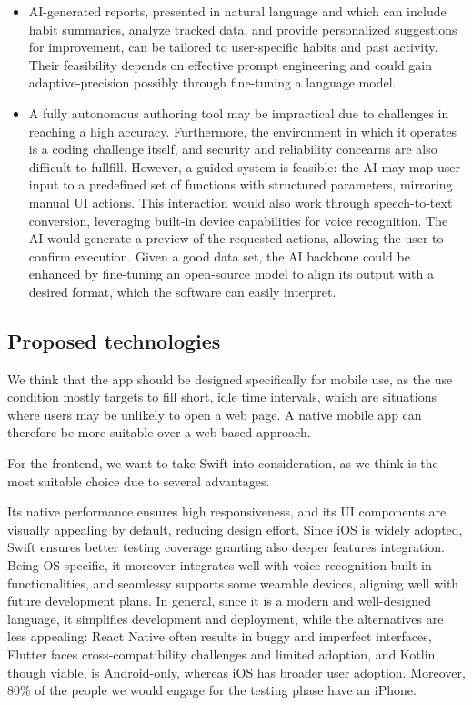 \documentclass{article}
\begin{document}
\begin{itemize}

    \item AI-generated reports, presented in natural language and which can include habit summaries, analyze tracked data, and provide personalized suggestions for improvement, can be tailored to user-specific habits and past activity. Their feasibility depends on effective prompt engineering and could gain adaptive-precision possibly through fine-tuning a language model.

    \item A fully autonomous authoring tool may be impractical due to challenges in reaching a high accuracy. Furthermore, the environment in which it operates is a coding challenge itself, and security and reliability concearns are also difficult to fullfill.
        However, a guided system is feasible: the AI may map user input to a predefined set of functions with structured parameters, mirroring manual UI actions. This interaction would also work through speech-to-text conversion, leveraging built-in device capabilities for voice recognition. The AI would generate a preview of the requested actions, allowing the user to confirm execution.
        Given a good data set, the AI backbone could be enhanced by fine-tuning an open-source model to align its output with a desired format, which the software can easily interpret.

\end{itemize}

\subsection{Proposed technologies}

We think that the app should be designed specifically for mobile use, as the use condition mostly targets to fill short, idle time intervals, which are situations where users may be unlikely to open a web page.
A native mobile app can therefore be more suitable over a web-based approach.

For the frontend, we want to take Swift into consideration, as we think is the most suitable choice due to several advantages.

Its native performance ensures high responsiveness, and its UI components are visually appealing by default, reducing design effort.
Since iOS is widely adopted, Swift ensures better testing coverage granting also deeper features integration.
Being OS-specific, it moreover integrates well with voice recognition built-in functionalities, and seamlessy supports some wearable devices, aligning well with future development plans.
In general, since it is a modern and well-designed language, it simplifies development and deployment, while the alternatives are less appealing: React Native often results in buggy and imperfect interfaces, Flutter faces cross-compatibility challenges and limited adoption, and Kotlin, though viable, is Android-only, whereas iOS has broader user adoption.
Moreover, 80\% of the people we would engage for the testing phase have an iPhone.
\end{document}
